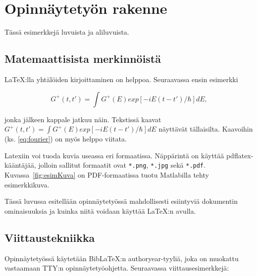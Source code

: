 \chapter{Opinnäytetyön rakenne}

Tässä esimerkkejä luvuista ja aliluvuista.

\section{Matemaattisista merkinnöistä}

\LaTeX:lla yhtälöiden kirjoittaminen on helppoa. Seuraavassa ensin esimerkki 

\begin{equation}
  \label{eq:fourier}
  G^+(t,t')= \int G^+(E) exp[-iE(t-t')/\hbar] dE,
\end{equation}

jonka jälkeen kappale jatkuu näin.
Tekstissä kaavat $G^+(t,t')= \int G^+(E) exp[-iE(t-t')/\hbar] dE$ näyttävät tällaisilta. 
Kaavoihin (ks. \ref{eq:fourier}) on myös helppo viitata.

%


Latexiin voi tuoda kuvia useassa eri formaatissa.
Näppärintä on käyttää pdflatex-kääntäjää, jolloin sallitut formaatit ovat \verb+*.png+, \verb+*.jpg+ sekä \verb+*.pdf+.
Kuvassa~\ref{fig:esimKuva} on PDF-formaatissa tuotu Matlabilla tehty esimerkkikuva.

Tässä luvussa esitellään opinnäytetyössä mahdollisesti esiintyviä dokumentin ominaisuuksia ja kuinka niitä voidaan käyttää \LaTeX:n avulla. 

\section{Viittaustekniikka}

Opinnäytetyössä käytetään BibLaTeX:n authoryear-tyyliä, joka on muokattu vastaamaan TTY:n opinnäytetyöohjetta.
Seuraavassa viittausesimerkkejä:

